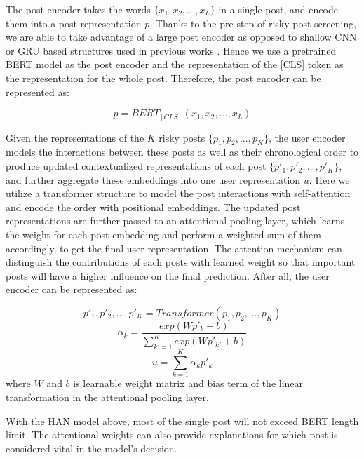 The post encoder takes the words $\{x_1, x_2, ..., x_L\}$ in a single post, and encode them into a post representation $p$. Thanks to the pre-step of risky post screening, we are able to take advantage of a large post encoder as opposed to shallow CNN or GRU based structures used in previous works \citep{yates2017depression, zogan2021explainable}. Hence we use a pretrained BERT model as the post encoder and the representation of the [CLS] token as the representation for the whole post. Therefore, the post encoder can be represented as: 

\begin{equation}
    p = BERT_{[CLS]}(x_1, x_2, ..., x_L)
\end{equation}

Given the representations of the $K$ risky posts $\{p_1, p_2, ..., p_K\}$, the user encoder models the interactions between these posts as well as their chronological order to produce updated contextualized representations of each post $\{p'_1, p'_2, ..., p'_K\}$, and further aggregate these embeddings into one user representation $u$. Here we utilize a transformer structure to model the post interactions with self-attention and encode the order with positional embeddings. The updated post representations are further passed to an attentional pooling layer, which learns the weight for each post embedding and perform a weighted sum of them accordingly, to get the final user representation. The attention mechanism can distinguish the contributions of each posts with learned weight so that important posts will have a higher influence on the final prediction. After all, the user encoder can be represented as:

\begin{equation}
    p'_1, p'_2, ..., p'_K = Transformer(p_1, p_2, ..., p_K)
\end{equation}
\begin{equation}
    \alpha_k = \frac{exp(W p'_k + b)}{\sum_{k'=1}^{K} exp(W p'_{k'} + b)}
\end{equation}
\begin{equation}
    u = \sum_{k=1}^K \alpha_k p'_k
\end{equation}
where $W$ and $b$ is learnable weight matrix and bias term of the linear transformation in the attentional pooling layer.

With the HAN model above, most of the single post will not exceed BERT length limit.  The attentional weights can also provide explanations for which post is considered vital in the model's decision. %

